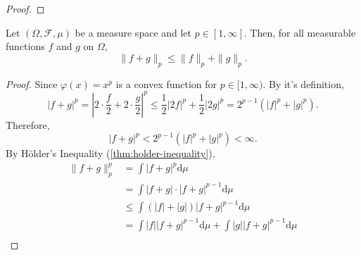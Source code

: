 \begin{proof}

\end{proof}

\begin{theorem} \label{thm:minkowski-inequality}
    Let $(\Omega,\mathcal{F},\mu)$ be a measure space and let $p\in[1,\infty]$. Then, for all measurable functions $f$ and $g$ on $\Omega$,
    \begin{equation}
        \|f+g\|_{p} \leq\|f\|_{p}+\|g\|_{p}.
    \end{equation}
\end{theorem}

\begin{proof}
    Since $\varphi(x)=x^p$ is a convex function for $p\in[1,\infty)$. By it's definition,
    \begin{equation*}
        |f+g|^{p}=\left|2\cdot\frac{f}{2}+2\cdot\frac{g}{2}\right|^{p}\leq \frac{1}{2}|2f|^p+\frac{1}{2}|2g|^p=2^{p-1}\left(|f|^{p}+|g|^{p}\right).
    \end{equation*}
    Therefore,
    \begin{equation*}
        |f+g|^{p}<2^{p-1}\left(|f|^{p}+|g|^{p}\right)<\infty.
    \end{equation*}
    By H\"older's Inequality (\ref{thm:holder-inequality}),
    \begin{equation*}
        \begin{aligned}
            \|f+g\|_{p}^{p} & =\int|f+g|^{p}\mathrm{d}\mu                                                                                                                                                                                         \\
                            & =\int|f+g| \cdot|f+g|^{p-1}\mathrm{d} \mu                                                                                                                                                                           \\
                            & \leq \int(|f|+|g|)|f+g|^{p-1}\mathrm{d}\mu                                                                                                                                                                          \\
                            & =\int|f||f+g|^{p-1}\mathrm{d}\mu+\int|g||f+g|^{p-1}\mathrm{d}\mu                                                                                                                                                    \\

\end{aligned}
\end{equation*}
\end{proof}
